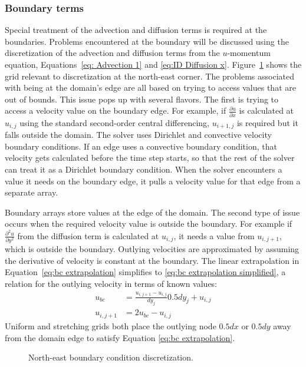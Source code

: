 \subsubsection{Boundary terms}
\label{sec:ID NS boundary}
Special treatment of the advection and diffusion terms is required at the boundaries. 
Problems encountered at the boundary will be discussed using the discretization of the advection and diffusion terms from the $u$-momentum equation, Equations~\eqref{eq: Advection 1} and \eqref{eq:ID Diffusion x}.
Figure~\ref{fig:ID iv bc} shows the grid relevant to discretization at the north-east corner. 
The problems associated with being at the domain's edge are all based on trying to access values that are out of bounds. 
This issue pops up with several flavors. 
The first is trying to access a velocity value on the boundary edge. 
For example, if $\frac{\partial u}{\partial x}$ is calculated at $u_{i,j}$ using the standard second-order central differencing, $u_{i+1,j}$ is required but it falls outside the domain. 
The solver uses Dirichlet and convective velocity boundary conditions. 
If an edge uses a convective boundary condition, that velocity gets calculated before the time step starts, so that the rest of the solver can treat it as a Dirichlet boundary condition. 
When the solver encounters a value it needs on the boundary edge, it pulls a velocity value for that edge from a separate array. 

Boundary arrays store values at the edge of the domain. 
The second type of issue occurs when the required velocity value is outside the boundary. 
For example if $\frac{\partial^2 u}{\partial y^2}$ from the diffusion term is calculated at $u_{i,j}$, it needs a value from $u_{i,j+1}$, which is outside the boundary. 
Outlying velocities are approximated by assuming the derivative of velocity is constant at the boundary. 
The linear extrapolation in Equation~\eqref{eq:bc extrapolation} simplifies to \eqref{eq:bc extrapolation simplified}, a relation for the outlying velocity in terms of known values:
\begin{align}
u_{bc} &= \frac{u_{i,j+1} - u_{i,j}}{dy_j}0.5dy_j+ u_{i,j} \label{eq:bc extrapolation} \\
u_{i,j+1} &= 2u_{bc} - u_{i,j} \; \label{eq:bc extrapolation simplified}
\end{align}
Uniform and stretching grids both place the outlying node $0.5dx$ or $0.5dy$ away from the domain edge to satisfy Equation \eqref{eq:bc extrapolation}. 
\begin{figure}[!htb]
	\centering
	
	\caption{North-east boundary condition discretization.}
	\label{fig:ID iv bc}
\end{figure}

